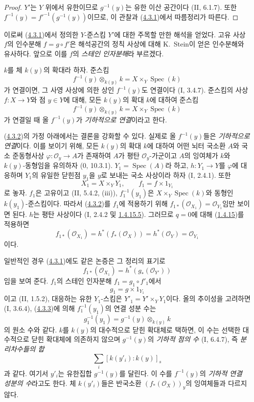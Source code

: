 \begin{proof}
$Y'$는 $Y$ 위에서 유한이므로 $g^{-1}(y)$는 유한 이산 공간이다
(II, 6.1.7). 또한 $f^{-1}(y)=f'^{-1}(g^{-1}(y))$이므로, 이 관찰과
(\hyperref[III.4.3.1-fr]{4.3.1})에서 따름정리가 따른다.
\end{proof}

이로써 (\hyperref[III.4.3.1-fr]{4.3.1})에서 정의한 $Y$-준스킴
$Y'$에 대한 주목할 만한 해석을 얻었다. 고유 사상 $f$의 인수분해
$f=g\circ f'$은 해석공간의 정칙 사상에 대해 K.~Stein이 얻은
인수분해와 유사하다. 앞으로 이를 $f$의 \emph{스테인 인자분해}라
부르겠다.

\begin{remark}[4.3.4]
\label{III.4.3.4-fr}
$k$를 체 $k(y)$의 확대라 하자. 준스킴
\[
f^{-1}(y)\otimes_{k(y)}k=X\times_Y\operatorname{Spec}(k)
\]
가 연결이면, 그 사영 사상에 의한 상인 $f^{-1}(y)$도 연결이다
(I, 3.4.7). 준스킴의 사상 $f:X\to Y$와 점 $y\in Y$에 대해, 모든
$k(y)$의 확대 $k$에 대하여 준스킴
\[
f^{-1}(y)\otimes_{k(y)}k=X\times_Y\operatorname{Spec}(k)
\]
가 연결일 때 올 $f^{-1}(y)$가 \emph{기하적으로 연결}이라고 한다.


(\hyperref[III.4.3.2-fr]{4.3.2})의 가정 아래에서는 결론을 강화할 수
있다. 실제로 올 $f^{-1}(y)$들은 \emph{기하적으로 연결}이다. 이를
보이기 위해, 모든 $k(y)$의 확대 $k$에 대하여 어떤 뇌터 국소환 $A$와
국소 준동형사상 $\varphi:\mathcal O_y\to A$가 존재하여 $A$가 평탄
$\mathcal O_y$-가군이고 $A$의 잉여체가 $k$와 $k(y)$-동형임을
유의하자 (0, 10.3.1). $Y_1=\operatorname{Spec}(A)$라 하고,
$h:Y_1\to Y$를 $\varphi$에 대응하며 $Y_1$의 유일한 닫힌점 $y_1$을
$y$로 보내는 국소 사상이라 하자 (I, 2.4.1). 또한
\[
X_1=X\times_YY_1,\qquad f_1=f\times1_{Y_1}
\]
로 놓자. $f_1$은 고유이고 (II, 5.4.2, (iii)),
$f_1^{-1}(y_1)$은 $X\times_Y\operatorname{Spec}(k)$와 동형인
$k(y_1)$-준스킴이다. 따라서
(\hyperref[III.4.3.2-fr]{4.3.2})를 $f_1$에 적용하기 위해
$f_{1*}(\mathcal O_{X_1})=\mathcal O_{Y_1}$임만 보이면 된다.
$h$는 평탄 사상이다 (I, 2.4.2 및
\hyperref[III.1.4.15-fr]{1.4.15.5}). 그러므로 $q=0$에 대해
(\hyperref[III.1.4.15-fr]{1.4.15})를 적용하면
\[
f_{1*}(\mathcal O_{X_1})
=h^*(f_*(\mathcal O_X))
=h^*(\mathcal O_Y)
=\mathcal O_{Y_1}
\]
이다.

일반적인 경우 (\hyperref[III.4.3.1-fr]{4.3.1})에도 같은 논증은 그
정리의 표기로
\[
f_{1*}(\mathcal O_{X_1})=h^*(g_*(\mathcal O_{Y'}))
\]
임을 보여 준다. $f_1$의 스테인 인자분해
$f_1=g_1\circ f'_1$에서
\[
g_1=g\times1_{Y_1}
\]
이고 (II, 1.5.2), 대응하는 유한 $Y_1$-스킴은
$Y'_1=Y'\times_YY_1$이다. 올의 추이성을 고려하면 (I, 3.6.4),
(\hyperref[III.4.3.3-fr]{4.3.3})에 의해 $f_1^{-1}(y_1)$의 연결
성분 수는
\[
g_1^{-1}(y_1)=g^{-1}(y)\otimes_{k(y)}k
\]
의 원소 수와 같다. $k$를 $k(y)$의 대수적으로 닫힌 확대체로 택하면,
이 수는 선택한 대수적으로 닫힌 확대체에 의존하지 않으며
$g^{-1}(y)$의 \emph{기하적 점의 수} (I, 6.4.7), 즉
\emph{분리차수들의 합}
\[
\sum_i[k(y'_i):k(y)]_s
\]
과 같다. 여기서 $y'_i$는 유한집합 $g^{-1}(y)$를 달린다. 이 수를
$f^{-1}(y)$의 \emph{기하적 연결 성분의 수}라고도 한다. 체
$k(y'_i)$들은 반국소환 $(f_*(\mathcal O_X))_y$의 잉여체들과
다르지 않다.
\end{remark}

